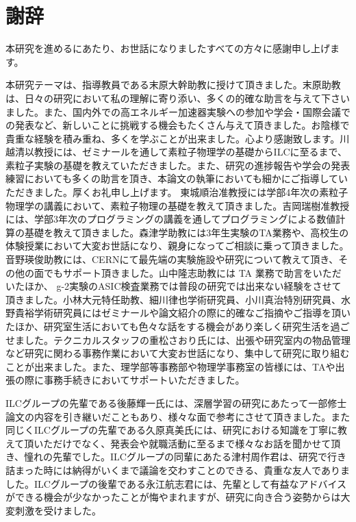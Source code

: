 
\clearpage

\chapter*{謝辞} \label{sec:Acknowledgement}
本研究を進めるにあたり、お世話になりましたすべての方々に感謝申し上げます。

本研究テーマは、指導教員である末原大幹助教に授けて頂きました。末原助教は、日々の研究において私の理解に寄り添い、多くの的確な助言を与えて下さいました。また、国内外での高エネルギー加速器実験への参加や学会・国際会議での発表など、新しいことに挑戦する機会もたくさん与えて頂きました。お陰様で貴重な経験を積み重ね、多くを学ぶことが出来ました。心より感謝致します。川越清以教授には、ゼミナールを通して素粒子物理学の基礎からILCに至るまで、素粒子実験の基礎を教えていただきました。また、研究の進捗報告や学会の発表練習においても多くの助言を頂き、本論文の執筆においても細かにご指導していただきました。厚くお礼申し上げます。
東城順治准教授には学部4年次の素粒子物理学の講義において、素粒子物理の基礎を教えて頂きました。吉岡瑞樹准教授には、学部3年次のプログラミングの講義を通してプログラミングによる数値計算の基礎を教えて頂きました。森津学助教には3年生実験のTA業務や、高校生の体験授業において大変お世話になり、親身になってご相談に乗って頂きました。音野瑛俊助教には、CERNにて最先端の実験施設や研究について教えて頂き、その他の面でもサポート頂きました。山中隆志助教には TA 業務で助言をいただいたほか、 g-2実験のASIC検査業務では普段の研究では出来ない経験をさせて頂きました。小林大元特任助教、細川律也学術研究員、小川真治特別研究員、水野貴裕学術研究員にはゼミナールや論文紹介の際に的確なご指摘やご指導を頂いたほか、研究室生活においても色々な話をする機会があり楽しく研究生活を過ごせました。テクニカルスタッフの重松さおり氏には、出張や研究室内の物品管理など研究に関わる事務作業において大変お世話になり、集中して研究に取り組むことが出来ました。また、理学部等事務部や物理学事務室の皆様には、TAや出張の際に事務手続きにおいてサポートいただきました。

ILCグループの先輩である後藤輝一氏には、深層学習の研究にあたって一部修士論文の内容を引き継いだこともあり、様々な面で参考にさせて頂きました。また同じくILCグループの先輩である久原真美氏には、研究における知識を丁寧に教えて頂いただけでなく、発表会や就職活動に至るまで様々なお話を聞かせて頂き、憧れの先輩でした。ILCグループの同輩にあたる津村周作君は、研究で行き詰まった時には納得がいくまで議論を交わすことのできる、貴重な友人でありました。ILCグループの後輩である永江航志君には、先輩として有益なアドバイスができる機会が少なかったことが悔やまれますが、研究に向き合う姿勢からは大変刺激を受けました。

